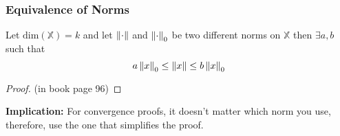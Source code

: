 \documentclass{beamer}
\begin{document}
\begin{frame}\frametitle{Equivalence of Norms}

\begin{theorem}
 Let $\text{dim}(\mathbb{X})=k$ and let $\left\|\cdot\right\| $ and $\left\|\cdot\right\|_0$ be two different norms on $\mathbb{X}$ then $\exists a,b$ such that 
\[ 
a\left\|x\right\|_0  \leq \left\|x\right\| \leq b\left\|x\right\|_0 
\]
\end{theorem}
\begin{proof}
 (in book page 96)
\end{proof}
 
{\bf Implication:}  For convergence proofs, it doesn't matter which norm you use, therefore, use the one that simplifies the proof.
\end{frame}
\end{document}
